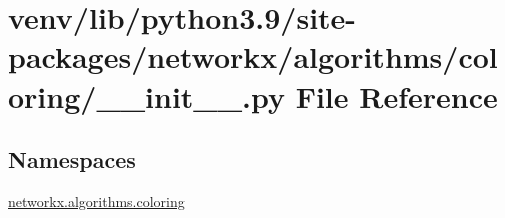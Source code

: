 \hypertarget{venv_2lib_2python3_89_2site-packages_2networkx_2algorithms_2coloring_2____init_____8py}{}\section{venv/lib/python3.9/site-\/packages/networkx/algorithms/coloring/\+\_\+\+\_\+init\+\_\+\+\_\+.py File Reference}
\label{venv_2lib_2python3_89_2site-packages_2networkx_2algorithms_2coloring_2____init_____8py}
\subsection*{Namespaces}
\begin{DoxyCompactItemize}
\item 
 \hyperlink{namespacenetworkx_1_1algorithms_1_1coloring}{networkx.\+algorithms.\+coloring}
\end{DoxyCompactItemize}
